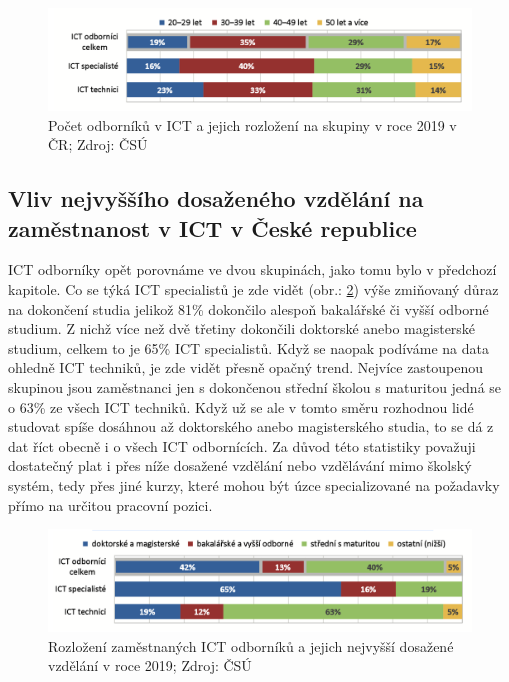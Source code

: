 \documentclass[12pt]{report}			%
\begin{document}
                \begin{figure}[h]
                    \centering
                     \includegraphics[width=16cm]{Maturitni Prace/images/odbornici_zamestnani_vek.png} 
                     \caption[Počet odborníků v ICT a jejich rozdělení v roce 2019 v ČR]{Počet odborníků v ICT a jejich rozložení na skupiny v roce 2019 v ČR; Zdroj: ČSÚ}
                     \label{fig:odbornici_zamestnani_vek}
                \end{figure}
        
            \subsection{Vliv nejvyššího dosaženého vzdělání na zaměstnanost v ICT v České republice}
                
                ICT odborníky opět porovnáme ve dvou skupinách, jako tomu bylo v předchozí kapitole. Co se týká ICT specialistů  je zde vidět (obr.: \ref{fig:odbornici_vzdelani}) výše zmiňovaný důraz na dokončení studia jelikož 81\% dokončilo alespoň bakalářské či vyšší odborné studium. Z nichž více než dvě třetiny dokončili doktorské anebo magisterské studium, celkem to je 65\% ICT specialistů. Když se naopak podíváme na data ohledně ICT techniků, je zde vidět přesně opačný trend. Nejvíce zastoupenou skupinou jsou zaměstnanci jen s dokončenou střední školou s maturitou jedná se o 63\% ze všech ICT techniků. Když už se ale v tomto směru rozhodnou lidé studovat spíše dosáhnou až doktorského anebo magisterského studia, to se dá z dat říct obecně i o všech ICT odbornících. Za důvod této statistiky považuji dostatečný plat i přes níže dosažené vzdělání nebo vzdělávání mimo školský systém, tedy přes jiné kurzy, které mohou být úzce specializované na požadavky přímo na určitou pracovní pozici.\cite{LidskeZdrojeVIT}
                
                \begin{figure}[h]
                    \centering
                     \includegraphics[width=16cm]{Maturitni Prace/images/odbornici_vzdelani.png}  
                     \caption[Rozložení zaměstnaných ICT odborníků - nejvyšší dosažené vzdělání 2019]{Rozložení zaměstnaných ICT odborníků a jejich nejvyšší dosažené vzdělání v roce 2019; Zdroj: ČSÚ}
                     \label{fig:odbornici_vzdelani}
                \end{figure}
  
\end{document}
